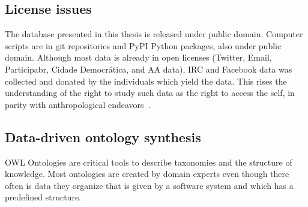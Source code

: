 \begin{enumerate}[leftmargin=0cm]
	\end{enumerate}

	\subsection{License issues}
	The database presented in this thesis is released under public domain.
	Computer scripts are in git repositories and PyPI Python packages, also under public domain.
	Although most data is already in open licenses (Twitter, Email, Participabr, Cidade Democrática, and AA data), IRC and Facebook data was collected
	and donated by the individuals which yield the data.
	This rises the understanding of the right to study such data as the right to access the self,
	in parity with anthropological endeavors~\cite{antphy,antphy2}.


\subsection{Data-driven ontology synthesis}
OWL Ontologies are critical tools to describe taxonomies and the
structure of knowledge.
Most ontologies are created by domain experts even though there often is data they
organize that is given by a software system and which has a predefined
structure.  

